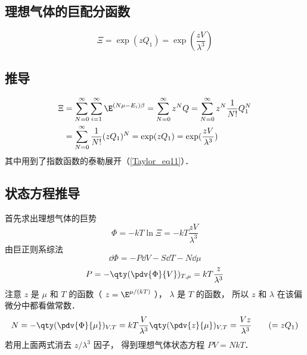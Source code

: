 
\subsection{理想气体的巨配分函数}
\begin{equation}\label{IdMCE_eq1}
\Xi  = \exp(z Q_1) = \exp(\frac{zV}{\lambda^3})
\end{equation}
\subsection{推导}
\begin{equation}\label{IdMCE_eq2}
\begin{aligned}
\Xi & = \sum_{N = 0}^\infty  \sum_{i = 1}^\infty  \E^{(N\mu - E_i)\beta}  = \sum_{N = 0}^\infty  z^N Q
 = \sum_{N = 0}^\infty  z^N \frac{1}{N!}Q_1^N \\
& = \sum_{N=0}^\infty  \frac{1}{N!} (z Q_1)^N
= \exp(z Q_1) = \exp(\frac{zV}{\lambda^3})
\end{aligned}
\end{equation}
其中用到了指数函数的泰勒展开（\autoref{Taylor_eq11}）．

\subsection{状态方程推导}
首先求出理想气体的巨势
\begin{equation}\label{IdMCE_eq4}
\Phi  =  - kT\ln \Xi  =  - kT\frac{zV}{\lambda ^3}
\end{equation}
由巨正则系综法
\begin{equation}\label{IdMCE_eq5}
\dd{\Phi} =  - P\dd{V} - S\dd{T} - N\dd{\mu}
\end{equation}
\begin{equation}\label{IdMCE_eq6}
P = - \qty(\pdv{\Phi}{V})_{T, \mu} = kT\frac{z}{\lambda ^3}
\end{equation}
注意 $z$ 是 $\mu $ 和 $T$ 的函数（ $z = \E^{\mu/(kT)}$ ）， $\lambda $ 是 $T$ 的函数， 所以 $z$ 和 $\lambda $ 在该偏微分中都看做常数．
\begin{equation}\label{IdMCE_eq7}
N = - \qty(\pdv{\Phi}{\mu})_{V,T} = kT\frac{V}{\lambda^3} \qty(\pdv{z}{\mu})_{V,T} = \frac{Vz}{\lambda ^3} 
\qquad ( = z{Q_1})
\end{equation}
若用上面两式消去 $z/\lambda^3$ 因子， 得到理想气体状态方程 $PV = NkT$．
  
